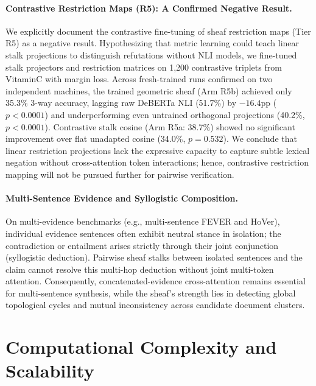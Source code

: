 \documentclass[11pt,a4paper]{article}
\begin{document}
\paragraph{Contrastive Restriction Maps (R5): A Confirmed Negative Result.}
We explicitly document the contrastive fine-tuning of sheaf restriction maps (Tier R5) as a negative result. Hypothesizing that metric learning could teach linear stalk projections to distinguish refutations without NLI models, we fine-tuned stalk projectors and restriction matrices on 1,200 contrastive triplets from VitaminC with margin loss. Across fresh-trained runs confirmed on two independent machines, the trained geometric sheaf (Arm R5b) achieved only 35.3\% 3-way accuracy, lagging raw DeBERTa NLI (51.7\%) by $-16.4$pp ($p < 0.0001$) and underperforming even untrained orthogonal projections (40.2\%, $p < 0.0001$). Contrastive stalk cosine (Arm R5a: 38.7\%) showed no significant improvement over flat unadapted cosine (34.0\%, $p = 0.532$). We conclude that linear restriction projections lack the expressive capacity to capture subtle lexical negation without cross-attention token interactions; hence, contrastive restriction mapping will not be pursued further for pairwise verification.

\paragraph{Multi-Sentence Evidence and Syllogistic Composition.}
On multi-evidence benchmarks (e.g., multi-sentence FEVER and HoVer), individual evidence sentences often exhibit neutral stance in isolation; the contradiction or entailment arises strictly through their joint conjunction (syllogistic deduction). Pairwise sheaf stalks between isolated sentences and the claim cannot resolve this multi-hop deduction without joint multi-token attention. Consequently, concatenated-evidence cross-attention remains essential for multi-sentence synthesis, while the sheaf's strength lies in detecting global topological cycles and mutual inconsistency across candidate document clusters.

\section{Computational Complexity and Scalability}
\end{document}
